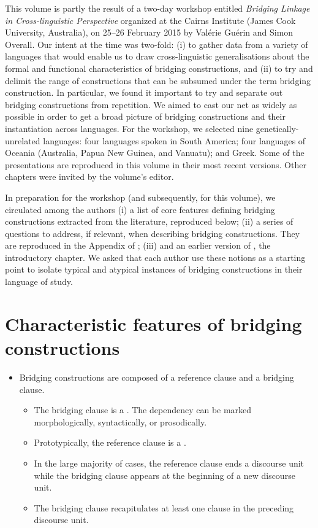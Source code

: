 \begin{refsection}


This volume is partly the result of a two-day workshop entitled \textit{Bridging Linkage in Cross-linguistic Perspective} organized at the Cairns Institute (James Cook University, Australia), on 25--26 February 2015 by Valérie Guérin and Simon Overall. Our intent at the time was two-fold: (i) to gather data from a variety of languages that would enable us to draw cross-linguistic generalisations about the formal and functional characteristics of bridging constructions, and (ii) to try and delimit the range of constructions that can be subsumed under the term bridging construction. In particular, we found it important to try and separate out bridging constructions from repetition. We aimed to cast our net as widely as possible in order to get a broad picture of bridging constructions and their instantiation across languages. For the workshop, we selected  nine genetically-unrelated languages: four languages spoken in South America; four languages of Oceania (Australia, Papua New Guinea, and Vanuatu); and Greek. Some of the presentations are reproduced in this volume in their most recent versions. Other chapters were invited by the volume’s editor. 

In preparation for the workshop (and subsequently, for this volume), we circulated among the authors (i) a list of core features defining bridging constructions extracted from the literature, reproduced below; (ii) a series of questions to address, if relevant, when describing bridging constructions. They are reproduced in the Appendix of ; (iii) and an earlier version of , the introductory chapter. We asked that each author use these notions as a starting point to isolate typical and atypical instances of bridging constructions in their language of study. 



\section*{Characteristic features of bridging constructions}


\begin{itemize}
\item Bridging constructions are composed of a reference clause and a bridging clause. 
   \begin{itemize}
   \item The bridging clause is a . The dependency can be marked morphologically, syntactically, or prosodically.
   \item  Prototypically, the reference clause is a . 
   \item In the large majority of cases, the reference clause ends a discourse unit while the bridging clause appears at the beginning of a new discourse unit.
   \item  The bridging clause recapitulates at least one clause in the preceding discourse unit. 
   \end{itemize}
   \end{itemize}
   

\end{refsection}
